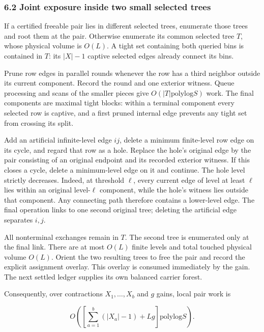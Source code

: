 \hypertarget{af-46593eb93e-joint-exposure-inside-two-small-selected-trees}{%
\subsubsection{6.2 Joint exposure inside two small selected trees}\label{af-46593eb93e-joint-exposure-inside-two-small-selected-trees}}

If a certified freeable pair lies in different selected trees, enumerate those trees and root them at the pair. Otherwise enumerate its common selected tree \(T\), whose physical volume is \(O(L)\). A tight set containing both queried bins is contained in \(T\): its \(|X|-1\) captive selected edges already connect its bins.

Prune row edges in parallel rounds whenever the row has a third neighbor outside its current component. Record the round and one exterior witness. Queue processing and scans of the smaller pieces give \(O(|T|\mathrm{polylog}S)\) work. The final components are maximal tight blocks: within a terminal component every selected row is captive, and a first pruned internal edge prevents any tight set from crossing its split.

Add an artificial infinite-level edge \(ij\), delete a minimum finite-level row edge on its cycle, and regard that row as a hole. Replace the hole's original edge by the pair consisting of an original endpoint and its recorded exterior witness. If this closes a cycle, delete a minimum-level edge on it and continue. The hole level strictly decreases. Indeed, at threshold \(\ell\), every current edge of level at least \(\ell\) lies within an original level-\(\ell\) component, while the hole's witness lies outside that component. Any connecting path therefore contains a lower-level edge. The final operation links to one second original tree; deleting the artificial edge separates \(i,j\).

All nonterminal exchanges remain in \(T\). The second tree is enumerated only at the final link. There are at most \(O(L)\) finite levels and total touched physical volume \(O(L)\). Orient the two resulting trees to free the pair and record the explicit assignment overlay. This overlay is consumed immediately by the gain. The next settled ledger supplies its own balanced carrier forest.

Consequently, over contractions \(X_1,\ldots,X_b\) and \(g\) gains, local pair work is

\[
O\!\left(\left[\sum_{a=1}^{b}(|X_a|-1)+Lg\right]
                     \mathrm{polylog}S\right).
 \tag{9}
\]

